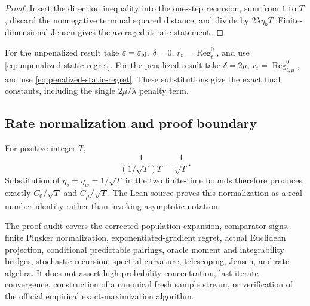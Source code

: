 \begin{proof}
Insert the direction inequality into the one-step recursion, sum from $1$ to
$T$, discard the nonnegative terminal squared distance, and divide by
$2\lambda\eta_bT$.  Finite-dimensional Jensen gives the averaged-iterate
statement.
\end{proof}

For the unpenalized result take
$\varepsilon=\varepsilon_{\rm id}$, $\delta=0$,
$r_t=\operatorname{Reg}_t^0$, and use
\eqref{eq:unpenalized-static-regret}.  For the penalized result take
$\delta=2\mu$, $r_t=\operatorname{Reg}_{t,\mu}^0$, and use
\eqref{eq:penalized-static-regret}.  These substitutions give the exact final
constants, including the single $2\mu/\lambda$ penalty term.

\subsection{Rate normalization and proof boundary}

For positive integer $T$,
\[
  \frac1{(1/\sqrt T)T}=\frac1{\sqrt T}.
\]
Substitution of $\eta_b=\eta_w=1/\sqrt T$ in the two finite-time bounds
therefore produces exactly $C_0/\sqrt T$ and $C_\mu/\sqrt T$.  The Lean source
proves this normalization as a real-number identity rather than invoking
asymptotic notation.

The proof audit covers the corrected population expansion, comparator signs,
finite Pinsker normalization, exponentiated-gradient regret, actual Euclidean
projection, conditional predictable pairings, oracle moment and integrability
bridges, stochastic recursion, spectral curvature, telescoping, Jensen, and
rate algebra.  It does not assert high-probability concentration,
last-iterate convergence, construction of a canonical fresh sample stream, or
verification of the official empirical exact-maximization algorithm.
